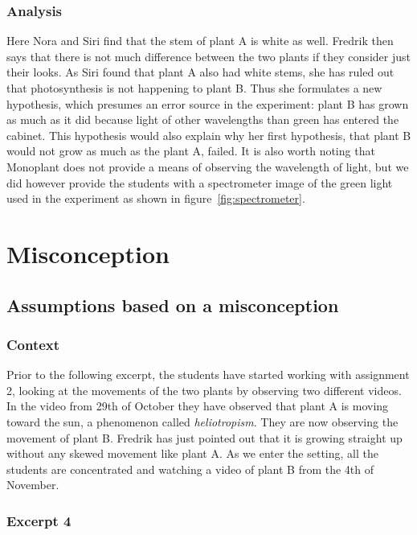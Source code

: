 \subsubsection*{Analysis}
Here Nora and Siri find that the stem of plant A is white as well. Fredrik then says that there is not much difference between the two plants if they consider just their looks. As Siri found that plant A also had white stems, she has ruled out that photosynthesis is not happening to plant B. Thus she formulates a new hypothesis, which presumes an error source in the experiment: plant B has grown as much as it did because light of other wavelengths than green has entered the cabinet.
This hypothesis would also explain why her first hypothesis, that plant B would not grow as much as the plant A, failed. It is also worth noting that Monoplant does not provide a means of observing the wavelength of light, but we did however provide the students with a spectrometer image of the green light used in the experiment as shown in figure~\ref{fig:spectrometer}.

\section{Misconception}
\label{cha:guidedinquiry}


\subsection{Assumptions based on a misconception}

\subsubsection*{Context}
Prior to the following excerpt, the students have started working with assignment 2, looking at the movements of the two plants by observing two different videos. In the video from 29th of October they have observed that plant A is moving toward the sun, a phenomenon called \emph{heliotropism}. They are now observing the movement of plant B. Fredrik has just pointed out that it is growing straight up without any skewed movement like plant A. As we enter the setting, all the students are concentrated and watching a video of plant B from the 4th of November.


\subsubsection*{Excerpt 4}\label{ex:excerpt4}

